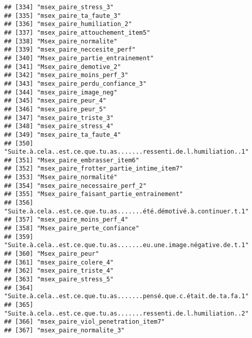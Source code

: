 \documentclass[
]{article}
\begin{document}
\begin{verbatim}
## [334] "msex_paire_stress_3"                                               
## [335] "msex_paire_ta_faute_3"                                             
## [336] "msex_paire_humiliation_2"                                          
## [337] "msex_paire_attouchement_item5"                                     
## [338] "Msex_paire_normalite"                                              
## [339] "msex_paire_neccesite_perf"                                         
## [340] "Msex_paire_partie_entrainement"                                    
## [341] "Msex_paire_demotive_2"                                             
## [342] "msex_paire_moins_perf_3"                                           
## [343] "msex_paire_perdu_confiance_3"                                      
## [344] "msex_paire_image_neg"                                              
## [345] "msex_paire_peur_4"                                                 
## [346] "msex_paire_peur_5"                                                 
## [347] "msex_paire_triste_3"                                               
## [348] "msex_paire_stress_4"                                               
## [349] "msex_paire_ta_faute_4"                                             
## [350] "Suite.à.cela..est.ce.que.tu.as.......ressenti.de.l.humiliation..1" 
## [351] "Msex_paire_embrasser_item6"                                        
## [352] "msex_paire_frotter_partie_intime_item7"                            
## [353] "Msex_paire_normalité"                                              
## [354] "msex_paire_necessaire_perf_2"                                      
## [355] "Msex_paire_faisant_partie_entrainement"                            
## [356] "Suite.à.cela..est.ce.que.tu.as.......été.démotivé.à.continuer.t.1" 
## [357] "msex_paire_moins_perf_4"                                           
## [358] "Msex_paire_perte_confiance"                                        
## [359] "Suite.à.cela..est.ce.que.tu.as.......eu.une.image.négative.de.t.1" 
## [360] "Msex_paire_peur"                                                   
## [361] "msex_paire_colere_4"                                               
## [362] "msex_paire_triste_4"                                               
## [363] "msex_paire_stress_5"                                               
## [364] "Suite.à.cela..est.ce.que.tu.as.......pensé.que.c.était.de.ta.fa.1" 
## [365] "Suite.à.cela..est.ce.que.tu.as.......ressenti.de.l.humiliation..2" 
## [366] "msex_paire_viol_penetration_item7"                                 
## [367] "msex_paire_normalite_3"                                            

\end{verbatim}
\end{document}
